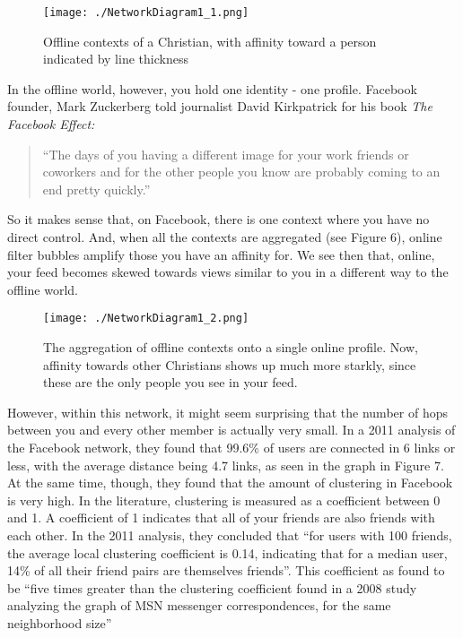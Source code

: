 \documentclass[]{article}
\begin{document}
\begin{figure}
\centering
\texttt{[image: ./NetworkDiagram1\_1.png]}
\caption{Offline contexts of a Christian, with affinity toward a person
indicated by line thickness}
\end{figure}

In the offline world, however, you hold one identity - one profile.
Facebook founder, Mark Zuckerberg told journalist David Kirkpatrick for
his book \emph{The Facebook Effect:}

\begin{quote}
``The days of you having a different image for your work friends or
coworkers and for the other people you know are probably coming to an
end pretty
quickly.''\autocite[pg 119]{KirkpatrickFacebookeffectstory2011}
\end{quote}

So it makes sense that, on Facebook, there is one context where you have
no direct control. And, when all the contexts are aggregated (see Figure
6), online filter bubbles amplify those you have an affinity for. We see
then that, online, your feed becomes skewed towards views similar to you
in a different way to the offline world.

\begin{figure}
\centering
\texttt{[image: ./NetworkDiagram1\_2.png]}
\caption{The aggregation of offline contexts onto a single online
profile. Now, affinity towards other Christians shows up much more
starkly, since these are the only people you see in your feed.}
\end{figure}

However, within this network, it might seem surprising that the number
of hops between you and every other member is actually very small. In a
2011 analysis of the Facebook network, they found that 99.6\% of users
are connected in 6 links or less, with the average distance being 4.7
links\autocite[pg 4-5]{UganderAnatomyFacebookSocial2011}, as seen in the
graph in Figure 7. At the same time, though, they found that the amount
of clustering in Facebook is very high. In the literature, clustering is
measured as a coefficient between 0 and 1. A coefficient of 1 indicates
that all of your friends are also friends with each other. In the 2011
analysis, they concluded that ``for users with 100 friends, the average
local clustering coefficient is 0.14, indicating that for a median user,
14\% of all their friend pairs are themselves
friends''\autocite[pg 6]{UganderAnatomyFacebookSocial2011}. This
coefficient as found to be ``five times greater than the clustering
coefficient found in a 2008 study analyzing the graph of MSN messenger
correspondences, for the same neighborhood
size''\autocite[pg 6]{UganderAnatomyFacebookSocial2011}
\end{document}
